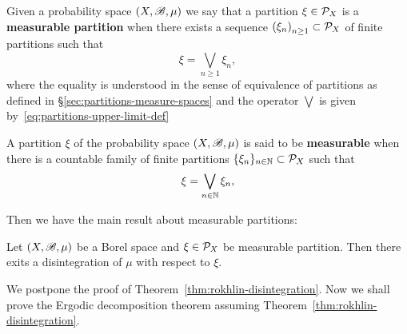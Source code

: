 Given a probability space $(X,\mathscr{B},\mu)$ we say that a partition $\xi\in\mathcal{P}_{X}$ is a \textbf{measurable partition} when there exists a sequence ${(\xi_{n})}_{n\geq 1}\subset\mathcal{P}_{X}$ of finite partitions such that
\begin{displaymath}
  \xi=\bigvee_{n\geq 1}\xi_{n},
\end{displaymath}
where the equality is understood in the sense of equivalence of partitions as defined in \S\ref{sec:partitions-measure-spaces} and the operator $\bigvee$ is given by~\eqref{eq:partitions-upper-limit-def}

A partition $\xi$ of the probability space $(X,\mathscr{B},\mu)$ is said to be \textbf{measurable} when there is a countable family of finite partitions $\{\xi_n\}_{n\in\mathbb{N}}\subset\mathcal{P}_{X}$ such that
\begin{displaymath}
  \xi=\bigvee_{n\in\mathbb{N}} \xi_n,
\end{displaymath}


Then we have the main result about measurable partitions:

\begin{theorem}\label{thm:rokhlin-disintegration}
  Let $(X,\mathscr{B},\mu)$ be a Borel space and $\xi\in\mathcal{P}_{X}$ be measurable partition. Then there exits a disintegration of $\mu$ with respect to $\xi$.
\end{theorem}

We postpone the proof of Theorem~\ref{thm:rokhlin-disintegration}. Now we shall prove the Ergodic decomposition theorem assuming Theorem~\ref{thm:rokhlin-disintegration}.

